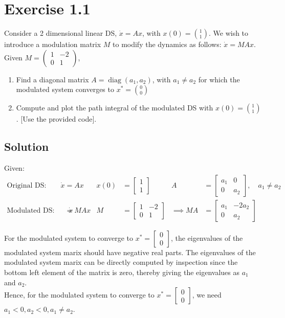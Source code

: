 \section*{Exercise 1.1}

Consider a 2 dimensional linear DS, \( \dot{x}=A x \), with \( x(0)=\binom{1}{1} \).
We wish to introduce a modulation matrix \( M \) to modify the dynamics as follows: \( \dot{x}=M A x \).
Given \( M=\left(\begin{array}{cc}1 & -2 \\ 0 & 1\end{array}\right) \),
\begin{enumerate}[noitemsep]
  \item Find a diagonal matrix \( A=\operatorname{diag}\left(a_{1}, a_{2}\right) \), with \( a_{1} \neq a_{2} \) for which the modulated system converges to \( x^{*}=\binom{0}{0} \)
  \item Compute and plot the path integral of the modulated DS with \( x(0)=\binom{1}{1} \). [Use the provided code].
\end{enumerate}

\subsection*{Solution}

Given:
\begin{align*}
  \text{Original DS:}
  \qquad
  \dot{x}
    & = A x
    &
  x(0)
    & =
  \begin{bmatrix} 1 \\ 1 \end{bmatrix}
    &
  A
    & =
  \begin{bmatrix} a_1 & 0 \\ 0 & a_2 \end{bmatrix},
  \quad a_1 \neq a_2
  \\
  \text{Modulated DS:}
  \qquad
  \dot{x}
    & =
  M A x
    &
  M & =
  \begin{bmatrix} 1 & -2 \\ 0 & 1 \end{bmatrix}
    &
  \implies
  M A
    & =
  \begin{bmatrix} a_1 & -2 a_2 \\ 0 & a_2 \end{bmatrix}
\end{align*}

For the modulated system to converge to \( x^{*}=\begin{bmatrix} 0 \\ 0 \end{bmatrix} \), the eigenvalues of the modulated system marix should have negative real parts.
The eigenvalues of the modulated system marix can be directly computed by inspection since the bottom left element of the matrix is zero, thereby giving the eigenvalues as \( a_1 \) and \( a_2 \).
\\
Hence, for the modulated system to converge to \( x^{*}=\begin{bmatrix} 0 \\ 0 \end{bmatrix} \), we need \( \boxed{a_1 < 0, a_2 < 0, a_1 \neq a_2} \).

